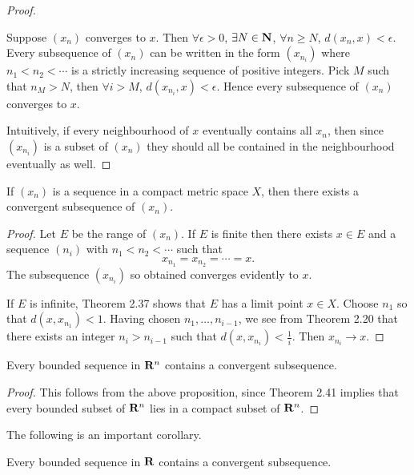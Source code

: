 \begin{proof} \

\fbox{$\implies$} Suppose $(x_n)$ converges to $x$. Then $\forall\epsilon>0$, $\exists N\in\mathbf N$, $\forall n\ge N$, $d(x_n,x)<\epsilon$. Every subsequence of $(x_n)$ can be written in the form $(x_{n_i})$ where $n_1<n_2<\cdots$ is a strictly increasing sequence of positive integers. Pick $M$ such that $n_M>N$, then $\forall i>M$, $d(x_{n_i},x)<\epsilon$. Hence every subsequence of $(x_n)$ converges to $x$.

\fbox{$\impliedby$} Intuitively, if every neighbourhood of $x$ eventually contains all $x_n$, then since $(x_{n_i})$ is a subset of $(x_n)$ they should all be contained in the neighbourhood eventually as well.
\end{proof}

\begin{lemma}
If $(x_n)$ is a sequence in a compact metric space $X$, then there exists a convergent subsequence of $(x_n)$.
\end{lemma}

\begin{proof}
Let $E$ be the range of $(x_n)$. If $E$ is finite then there exists $x\in E$ and a sequence $(n_i)$ with $n_1<n_2<\cdots$ such that
\[x_{n_1}=x_{n_2}=\cdots=x.\]
The subsequence $(x_{n_i})$ so obtained converges evidently to $x$.

If $E$ is infinite, Theorem 2.37 shows that $E$ has a limit point $x\in X$. Choose $n_1$ so that $d(x,x_{n_1})<1$. Having chosen $n_1,\dots,n_{i-1}$, we see from Theorem 2.20 that there exists an integer $n_i>n_{i-1}$ such that $d(x,x_{n_i})<\frac{1}{i}$. Then $x_{n_i}\to x$.
\end{proof}

\begin{proposition}
Every bounded sequence in $\mathbf R^n$ contains a convergent subsequence.
\end{proposition}

\begin{proof}
This follows from the above proposition, since Theorem 2.41 implies that every bounded subset of $\mathbf R^n$ lies in a compact subset of $\mathbf R^n$.
\end{proof}

The following is an important corollary.

\begin{theorem}
Every bounded sequence in $\mathbf R$ contains a convergent subsequence.
\end{theorem}

